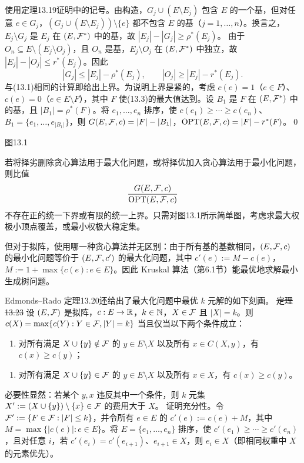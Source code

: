 \pr 使用定理13.19证明中的记号。由构造，$G_j\cup(E\setminus E_j)$ 包含 $E$ 的一个基，但对任意 $e\in G_j$，$(G_j\cup(E\setminus E_j))\setminus\{e\}$ 都不包含 $E$ 的基（$j=1,\ldots,n$）。换言之，$E_j\setminus G_j$ 是 $E_j$ 在 $(E,\mathcal F^*)$ 中的基，故 $|E_j|-|G_j|\ge\rho^*(E_j)$。
由于 $O_n\subseteq E\setminus(E_j\setminus O_j)$，且 $O_n$ 是基，$E_j\setminus O_j$ 在 $(E,\mathcal F^*)$ 中独立，故 $|E_j|-|O_j|\le r^*(E_j)$。因此
\[|G_j|\le|E_j|-\rho^*(E_j),\qquad |O_j|\ge|E_j|-r^*(E_j).\]
与(13.1)相同的计算即给出上界。为说明上界是紧的，考虑 $c(e)=1$（$e\in F$）、$c(e)=0$（$e\in E\setminus F$），其中 $F$ 使(13.3)的最大值达到。设 $B_1$ 是 $F$ 在 $(E,\mathcal F^*)$ 中的基，且 $|B_1|=\rho^*(F)$。将 $e_1,\ldots,e_n$ 排序，使 $c(e_1)\ge\cdots\ge c(e_n)$、$B_1=\{e_1,\ldots,e_{|B_1|}\}$，则 $G(E,\mathcal F,c)=|F|-|B_1|$，$\operatorname{OPT}(E,\mathcal F,c)=|F|-r^*(F)$。\qed
\begin{center}
\par\small 图13.1
\end{center}
若将择劣删除贪心算法用于最大化问题，或将择优加入贪心算法用于最小化问题，则比值
\[\frac{G(E,\mathcal F,c)}{\operatorname{OPT}(E,\mathcal F,c)}\]
不存在正的统一下界或有限的统一上界。只需对图13.1所示简单图，考虑求最大权极小顶点覆盖，或最小权极大稳定集。

但对于拟阵，使用哪一种贪心算法并无区别：由于所有基的基数相同，$(E,\mathcal F,c)$ 的最小化问题等价于 $(E,\mathcal F,c')$ 的最大化问题，其中 $c'(e):=M-c(e)$，$M:=1+\max\{c(e):e\in E\}$。因此 Kruskal 算法（第6.1节）能最优地求解最小生成树问题。

Edmonds--Rado 定理13.20还给出了最大化问题中最优 $k$ 元解的如下刻画。
\st{定理13.23} 设 $(E,\mathcal F)$ 是拟阵，$c:E\to\mathbb R$，$k\in\mathbb N$，$X\in\mathcal F$ 且 $|X|=k$。则 $c(X)=\max\{c(Y):Y\in\mathcal F,|Y|=k\}$ 当且仅当以下两个条件成立：
\begin{enumerate}[label=(\alph*)]
\item 对所有满足 $X\cup\{y\}\notin\mathcal F$ 的 $y\in E\setminus X$ 以及所有 $x\in C(X,y)$，有 $c(x)\ge c(y)$；
\end{enumerate}

\begin{enumerate}[label=(\alph*),start=2]
\item 对所有满足 $X\cup\{y\}\in\mathcal F$ 的 $y\in E\setminus X$ 以及所有 $x\in X$，有 $c(x)\ge c(y)$。
\end{enumerate}
\pr 必要性显然：若某个 $y,x$ 违反其中一个条件，则 $k$ 元集 $X':=(X\cup\{y\})\setminus\{x\}\in\mathcal F$ 的费用大于 $X$。
证明充分性。令 $\mathcal F':=\{F\in\mathcal F:|F|\le k\}$，并令所有 $e\in E$ 的 $c'(e):=c(e)+M$，其中 $M=\max\{|c(e)|:e\in E\}$。将 $E=\{e_1,\ldots,e_n\}$ 排序，使 $c'(e_1)\ge\cdots\ge c'(e_n)$，且对任意 $i$，若 $c'(e_i)=c'(e_{i+1})$、$e_{i+1}\in X$，则 $e_i\in X$（即相同权重中 $X$ 的元素优先）。

